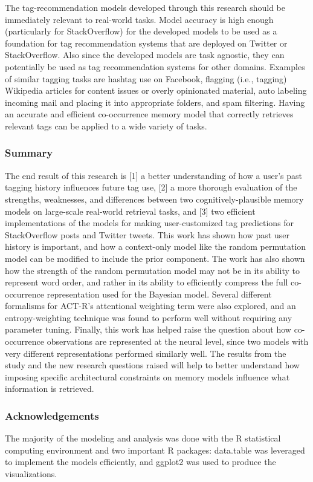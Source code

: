 \documentclass[man,floatsintext,donotrepeattitle]{apa6}
\begin{document}
The tag-recommendation models developed through this research should be immediately relevant to real-world tasks.
Model accuracy is high enough (particularly for StackOverflow) for the developed models to be used as a foundation for tag recommendation systems that are deployed on Twitter or StackOverflow.
Also since the developed models are task agnostic, they can potentially be used as tag recommendation systems for other domains.
Examples of similar tagging tasks are hashtag use on Facebook, flagging (i.e., tagging) Wikipedia articles for content issues or overly opinionated material,
auto labeling incoming mail and placing it into appropriate folders, and spam filtering.
Having an accurate and efficient co-occurrence memory model that correctly retrieves relevant tags can be applied to a wide variety of tasks.

\subsubsection{Summary}

The end result of this research is [1] a better understanding of how a user's past tagging history influences future tag use,
[2] a more thorough evaluation of the strengths, weaknesses, and differences between two cognitively-plausible memory models on large-scale real-world retrieval tasks,
and [3] two efficient implementations of the models for making user-customized tag predictions for StackOverflow posts and Twitter tweets. 
This work has shown how past user history is important, and how a context-only model like the random permutation model can be modified to include the prior component.
The work has also shown how the strength of the random permutation model may not be in its ability to represent word order,
and rather in its ability to efficiently compress the full co-occurrence representation used for the Bayesian model.
Several different formalisms for ACT-R's attentional weighting term were also explored, and an entropy-weighting technique was found to perform well without requiring any parameter tuning.
Finally, this work has helped raise the question about how co-occurrence observations are represented at the neural level, since two models with very different representations performed similarly well.
The results from the study and the new research questions raised will help to better understand how imposing specific architectural constraints on memory models influence what information is retrieved.

\subsubsection{Acknowledgements}

The majority of the modeling and analysis was done with the R statistical computing environment \parencite{RCoreTeam2014} and two important R packages:
data.table \parencite{Dowle2014} was leveraged to implement the models efficiently, and ggplot2 \parencite{Wickham2009} was used to produce the visualizations.

\begingroup
{}
\setlength\bibitemsep{12pt}
\clearpage
\printbibliography[heading=bibintoc]
\endgroup
\end{document}
